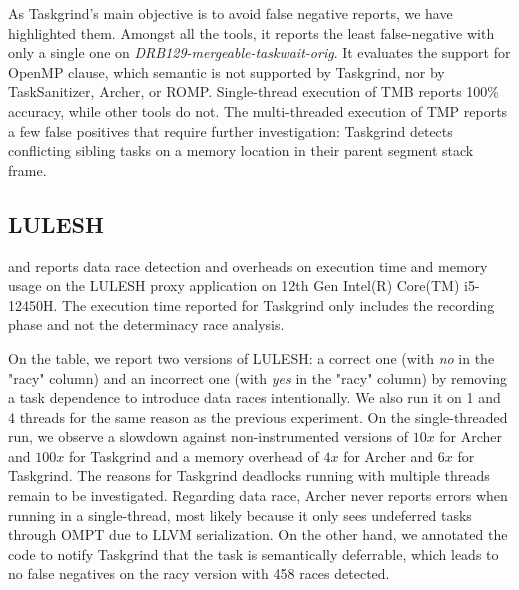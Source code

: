 As Taskgrind's main objective is to avoid false negative reports, we have highlighted them.
Amongst all the tools, it reports the least false-negative with only a single one on \emph{DRB129-mergeable-taskwait-orig}.
It evaluates the support for OpenMP  clause, which semantic is not supported by Taskgrind, nor by TaskSanitizer, Archer, or ROMP.
Single-thread execution of TMB reports 100\% accuracy, while other tools do not.
The multi-threaded execution of TMP reports a few false positives that require further investigation: Taskgrind detects conflicting sibling tasks on a memory location in their parent segment stack frame.

%

\subsection{LULESH}
 and  reports data race detection and overheads on execution time and memory usage on the LULESH proxy application on 12th Gen Intel(R) Core(TM) i5-12450H.
The execution time reported for Taskgrind only includes the recording phase and not the determinacy race analysis.

On the table, we report two versions of LULESH: a correct one (with \emph{no} in the "racy" column) and an incorrect one (with \emph{yes} in the "racy" column) by removing a task dependence to introduce data races intentionally.
We also run it on 1 and 4 threads for the same reason as the previous experiment.
On the single-threaded run, we observe a slowdown against non-instrumented versions of $10x$ for Archer and $100x$ for Taskgrind and a memory overhead of $4x$ for Archer and $6x$ for Taskgrind.
The reasons for Taskgrind deadlocks running with multiple threads remain to be investigated.
Regarding data race, Archer never reports errors when running in a single-thread, most likely because it only sees undeferred tasks through OMPT due to LLVM serialization.
On the other hand, we annotated the code to notify Taskgrind that the task is semantically deferrable, which leads to no false negatives on the racy version with 458 races detected.

